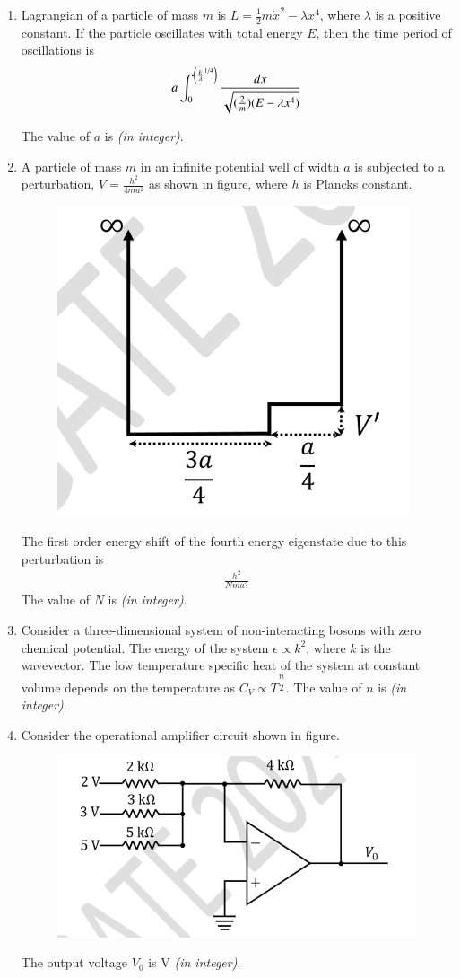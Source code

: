 \documentclass[journal,12pt,onecolumn]{IEEEtran}
\theoremstyle{remark}
\begin{document}
\begin{enumerate}
\item Lagrangian of a particle of mass $m$ is $L = \frac{1}{2} m \dot{x}^2 - \lambda x^4$, where $\lambda$ is a positive constant. If the particle oscillates with total energy $E$, then the time period of oscillations is
\begin{align*}
    a \int_0^{\left({\frac{E}{\lambda}}^{1/4}\right)} \frac{dx}{\sqrt{(\frac{2}{m})(E-\lambda x^4)}}
\end{align*}


The value of $a$ is \underline{\hspace{2cm}} \textit{(in integer)}.

\item A particle of mass $m$ in an infinite potential well of width $a$ is subjected to a perturbation, $V = \frac{h^2}{4 m a^2}$ as shown in figure, where $h$ is Plancks constant.
\begin{figure}[H]   
\centering    
\includegraphics[width = 0.4\columnwidth]{fig/Q61.png}     \caption*{}  
\label{fig: 61} 
\end{figure} 
The first order energy shift of the fourth energy eigenstate due to this perturbation is
\begin{align*}
\frac{h^2}{N m a^2}
\end{align*}
The value of $N$ is \underline{\hspace{2cm}} \textit{(in integer)}.

\item Consider a three-dimensional system of non-interacting bosons with zero chemical potential. The energy of the system $\epsilon \propto k^2$, where $k$ is the wavevector. The low temperature specific heat of the system at constant volume depends on the temperature as $C_V \propto T^{\dfrac{n}{2}}$. The value of $n$ is \underline{\hspace{2cm}} \textit{(in integer)}.

\item Consider the operational amplifier circuit shown in figure.
\begin{figure}[H]  
\centering   
\includegraphics[width = 0.6\columnwidth]{fig/Q63.png}     \caption*{}  
\label{fig: Q63}
\end{figure} 
The output voltage $V_0$ is \underline{\hspace{2cm}} V \textit{(in integer)}.


\end{enumerate}
\end{document}
